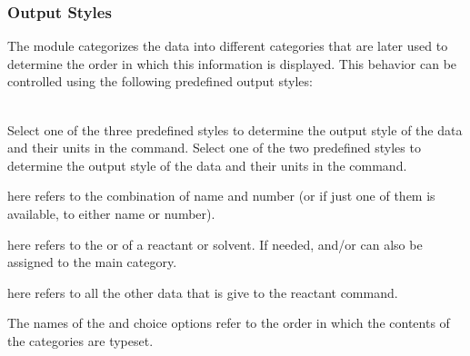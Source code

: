\documentclass{chemmacros-manual}
\begin{document}
\subsubsection{Output Styles}\label{sec:output-styles}

The  module categorizes the data into different categories
that are later used to determine the order in which this information is
displayed. This behavior can be controlled using the following predefined
output styles:

\begin{options}
    \\[-\baselineskip]
    Select one of the three predefined styles to determine the output style of
    the data and their units in the  command.
    Select one of the two predefined styles to determine the output style of
    the data and their units in the  command.
\end{options}

 here refers to the combination of name and number (or if just one
of them is available, to either name or number).
    
 here refers to the  or  of a reactant or
solvent. If needed,  and/or  can also be assigned to
the main category.
    
 here refers to all the other data that is give to the reactant
command.

The names of the  and
 choice options refer to the order in which the
contents of the categories are typeset.

\begin{example}
  \par
  \par
  
  \par
\end{example}
\end{document}
